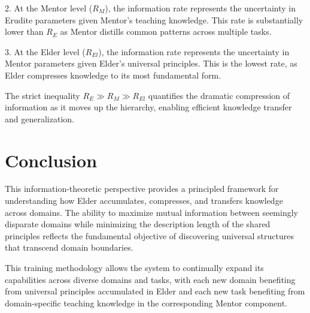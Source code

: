 2. At the Mentor level ($R_M$), the information rate represents the uncertainty in Erudite parameters given Mentor's teaching knowledge. This rate is substantially lower than $R_E$ as Mentor distills common patterns across multiple tasks.

3. At the Elder level ($R_{El}$), the information rate represents the uncertainty in Mentor parameters given Elder's universal principles. This is the lowest rate, as Elder compresses knowledge to its most fundamental form.

The strict inequality $R_E \gg R_M \gg R_{El}$ quantifies the dramatic compression of information as it moves up the hierarchy, enabling efficient knowledge transfer and generalization.

\section{Conclusion}

This information-theoretic perspective provides a principled framework for understanding how Elder accumulates, compresses, and transfers knowledge across domains. The ability to maximize mutual information between seemingly disparate domains while minimizing the description length of the shared principles reflects the fundamental objective of discovering universal structures that transcend domain boundaries.

This training methodology allows the system to continually expand its capabilities across diverse domains and tasks, with each new domain benefiting from universal principles accumulated in Elder and each new task benefiting from domain-specific teaching knowledge in the corresponding Mentor component.